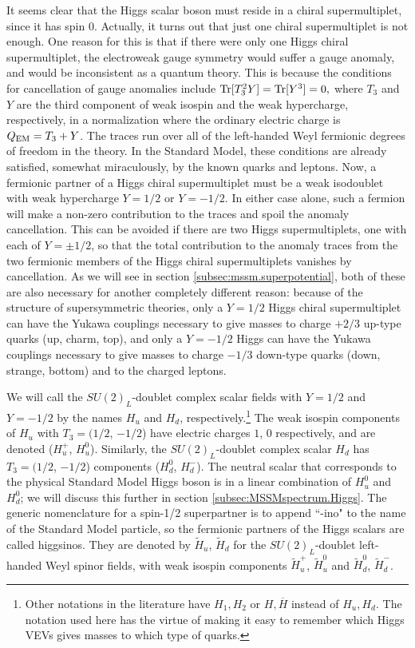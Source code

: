 \documentclass[11pt]{article}
\def\sbar{\overline}
\def\stilde{\widetilde}
\begin{document}
It seems clear that the Higgs scalar boson must reside in a chiral
supermultiplet, since it has spin 0. Actually, it turns out that just one
chiral supermultiplet is not enough. One reason for this is that
if there were only one Higgs chiral supermultiplet, the electroweak gauge
symmetry would suffer a gauge anomaly, and would be inconsistent as a
quantum theory. This is because the conditions for cancellation of gauge
anomalies include $ {\rm Tr}[T_3^2 Y] = {\rm Tr}[Y^3] = 0, $ where $T_3$
and $Y$ are the third component of weak isospin and the weak hypercharge,
respectively, in a normalization where the ordinary electric charge is
$Q_{\rm EM} = T_3 + Y$. The traces run over all of the left-handed Weyl
fermionic degrees of freedom in the theory. In the Standard Model, these
conditions are already satisfied, somewhat miraculously, by the known
quarks and leptons. Now, a fermionic partner of a Higgs chiral
supermultiplet must be a weak isodoublet with weak hypercharge $Y=1/2$ or
$Y=-1/2$. In either case alone, such a fermion will make a non-zero
contribution to the traces and spoil the anomaly cancellation. This can be
avoided if there are two Higgs supermultiplets, one with each of $Y=\pm
1/2$, so that the total contribution to the anomaly traces from the two
fermionic members of the Higgs chiral supermultiplets vanishes by
cancellation. As we will see in section \ref{subsec:mssm.superpotential},
both of these are also necessary for another completely different reason:
because of the structure of supersymmetric theories, only a $Y=1/2$ Higgs
chiral supermultiplet can have the Yukawa couplings necessary to give
masses to charge $+2/3$ up-type quarks (up, charm, top), and only a
$Y=-1/2$ Higgs can have the Yukawa couplings necessary to give masses to
charge $-1/3$ down-type quarks (down, strange, bottom) and to the charged
leptons. 

We will call the $SU(2)_L$-doublet complex scalar fields with
$Y=1/2$ and $Y=-1/2$ by the names $H_u$ and $H_d$,
respectively.\footnote{Other notations in the literature have
$H_1, H_2$ or $H,\sbar H$ instead of $H_u, H_d$. The notation used here
has the virtue of making it easy to remember which Higgs VEVs
gives masses to which type of quarks.} The weak isospin components of
$H_u$ with $T_3=(1/2$, $-1/2$) have electric charges $1$, $0$
respectively, and are denoted ($H_u^+$, $H_u^0$). Similarly, the
$SU(2)_L$-doublet complex scalar $H_d$ has $T_3=(1/2$, $-1/2$) components
($H_d^0$, $H_d^-$). The neutral scalar that corresponds to the physical
Standard Model Higgs boson is in a linear combination of $H_u^0$ and
$H_d^0$; we will discuss this further in section
\ref{subsec:MSSMspectrum.Higgs}.  The generic nomenclature for a spin-1/2
superpartner is to append ``-ino" to the name of the Standard Model
particle, so the fermionic partners of the Higgs scalars are called
higgsinos. They are denoted by $\stilde H_u$, $\stilde H_d$ for the
$SU(2)_L$-doublet left-handed Weyl spinor fields, with weak isospin
components $\stilde H_u^+$, $\stilde H_u^0$ and $\stilde H_d^0$, $\stilde
H_d^-$. 
\end{document}
